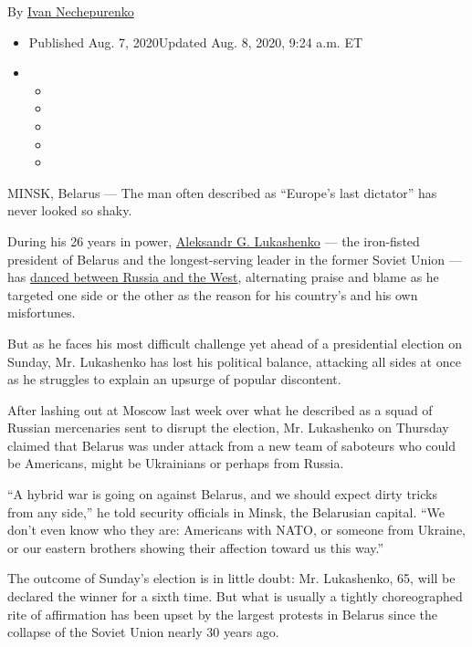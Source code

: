 By \href{https://www.nytimes.com/by/ivan-nechepurenko}{Ivan
Nechepurenko}

\begin{itemize}
\item
  Published Aug. 7, 2020Updated Aug. 8, 2020, 9:24 a.m. ET
\item
  \begin{itemize}
  \item
  \item
  \item
  \item
  \item
  \end{itemize}
\end{itemize}

MINSK, Belarus --- The man often described as ``Europe's last dictator''
has never looked so shaky.

During his 26 years in power,
\href{https://www.nytimes.com/2020/06/22/world/europe/belarus-lukashenko-russia.html}{Aleksandr
G. Lukashenko} --- the iron-fisted president of Belarus and the
longest-serving leader in the former Soviet Union --- has
\href{https://www.nytimes.com/2017/08/13/world/europe/belarus-russia-aleksandr-lukashenko.html}{danced
between Russia and the West}, alternating praise and blame as he
targeted one side or the other as the reason for his country's and his
own misfortunes.

But as he faces his most difficult challenge yet ahead of a presidential
election on Sunday, Mr. Lukashenko has lost his political balance,
attacking all sides at once as he struggles to explain an upsurge of
popular discontent.

After lashing out at Moscow last week over what he described as a squad
of Russian mercenaries sent to disrupt the election, Mr. Lukashenko on
Thursday claimed that Belarus was under attack from a new team of
saboteurs who could be Americans, might be Ukrainians or perhaps from
Russia.

``A hybrid war is going on against Belarus, and we should expect dirty
tricks from any side,'' he told security officials in Minsk, the
Belarusian capital. ``We don't even know who they are: Americans with
NATO, or someone from Ukraine, or our eastern brothers showing their
affection toward us this way.''

The outcome of Sunday's election is in little doubt: Mr. Lukashenko, 65,
will be declared the winner for a sixth time. But what is usually a
tightly choreographed rite of affirmation has been upset by the largest
protests in Belarus since the collapse of the Soviet Union nearly 30
years ago.

